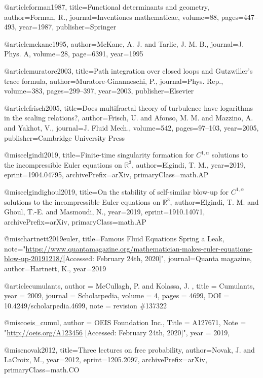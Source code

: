 @article{forman1987,
  title={Functional determinants and geometry},
  author={Forman, R.},
  journal={Inventiones mathematicae},
  volume={88},
  pages={447--493},
  year={1987},
  publisher={Springer}
}

@article{mckane1995,
  author={McKane, A. J. and Tarlie, J. M. B.},
  journal={J. Phys. A},
  volume={28},
  page={6391},
  year={1995}
  }

@article{muratore2003,
  title={{Path integration over closed loops and Gutzwiller's trace formula}},
  author={Muratore-Ginanneschi, P.},
  journal={Phys. Rep.},
  volume={383},
  pages={299--397},
  year={2003},
  publisher={Elsevier}
}

@article{frisch2005,
  title={Does multifractal theory of turbulence have logarithms in the scaling relations?},
  author={Frisch, U. and Afonso, M. M. and Mazzino, A. and Yakhot, V.},
  journal={J. Fluid Mech.},
  volume={542},
  pages={97--103},
  year={2005},
  publisher={Cambridge University Press}
}

@misc{elgindi2019,
    title={{Finite-time singularity formation for $C^{1,α}$ solutions to the incompressible Euler equations on $\mathbb{R}^3$}},
    author={Elgindi, T. M.},
    year={2019},
    eprint={1904.04795},
    archivePrefix={arXiv},
    primaryClass={math.AP}
}

@misc{elgindighoul2019,
    title={{On the stability of self-similar blow-up for $C^{1,α}$ solutions to the incompressible Euler equations on $\mathbb{R}^3$}},
    author={Elgindi, T. M. and Ghoul, T.-E. and Masmoudi, N.},
    year={2019},
    eprint={1910.14071},
    archivePrefix={arXiv},
    primaryClass={math.AP}
}

@misc{hartnett2019euler,
   title={Famous Fluid Equations Spring a Leak},
   note="\url{https://www.quantamagazine.org/mathematician-makes-euler-equations-blow-up-20191218/}[Accessed: February 24th, 2020]",
   journal={Quanta magazine},
   author={Hartnett, K.},
   year={2019}
   }

@article{cumulants,
  author = {McCullagh, P.  and Kolassa, J. },
  title   = {{C}umulants},
  year    = {2009},
  journal = {Scholarpedia},
  volume  = {4},
  pages   = {4699},
  DOI     = {10.4249/scholarpedia.4699},
  note    = {revision \#137322}
}

@misc{oeis_cumul,
    author = {{OEIS Foundation Inc.}},
    Title  = {A127671},
    Note   = "\url{http://oeis.org/A123456} [Accessed: February 24th, 2020]",
    year = {2019},
  }

@misc{novak2012,
    title={Three lectures on free probability},
    author={Novak, J. and LaCroix, M.},
    year={2012},
    eprint={1205.2097},
    archivePrefix={arXiv},
    primaryClass={math.CO}
}

